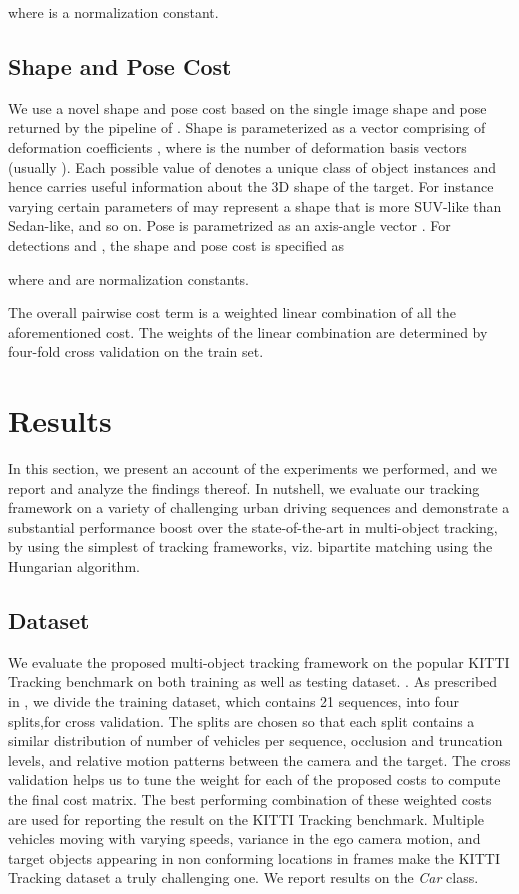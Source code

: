 \documentclass[letterpaper, 10 pt, conference]{ieeeconf}
\begin{document}
where  is a normalization constant.

\subsection{Shape and Pose Cost}

We use a novel shape and pose cost based on the single image shape and pose returned by the pipeline of \cite{KM_ICRA} . Shape is parameterized as a vector comprising of deformation coefficients , where  is the number of deformation basis vectors (usually ). Each possible value of  denotes a unique class of object instances and hence carries useful information about the 3D shape of the target. For instance varying certain parameters of  may represent a shape that is more SUV-like than Sedan-like, and so on. Pose is parametrized as an axis-angle vector . For detections  and , the shape and pose cost is specified as

where  and  are normalization constants.

The overall pairwise cost term is a weighted linear combination of all the aforementioned cost. The weights of the linear combination are determined by four-fold cross validation on the train set.



\section{Results}

In this section, we present an account of the experiments we performed, and we report and analyze the findings thereof. In nutshell, we evaluate our tracking framework on a variety of challenging urban driving sequences and demonstrate a substantial performance boost over the state-of-the-art in multi-object tracking, by using the simplest of tracking frameworks, viz. bipartite matching using the Hungarian algorithm.

\subsection{Dataset}
We evaluate the proposed multi-object tracking framework on the popular KITTI Tracking benchmark on both training as well as testing dataset. \cite{KITTI}. As prescribed in \cite{DeepNetworkFlow,NOMT,KITTI}, we divide the training dataset, which contains 21 sequences, into four splits,for cross validation. The splits are chosen so that each split contains a similar distribution of number of vehicles per sequence, occlusion and truncation levels, and relative motion patterns between the camera and the target. The cross validation helps us to tune the weight for each of the proposed costs to compute the final cost matrix. The best performing combination of these weighted costs are used for reporting the result on the KITTI Tracking benchmark. Multiple vehicles moving with varying speeds, variance in the ego camera motion, and target objects appearing in non conforming locations in frames make the KITTI Tracking dataset \cite{KITTI} a truly challenging one. We report results on the \emph{Car} class.
\end{document}
